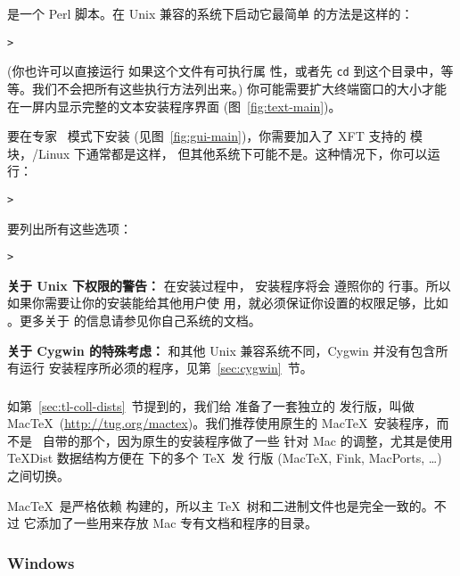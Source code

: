 \documentclass{article}
\begin{document}
 是一个 Perl 脚本。在 Unix 兼容的系统下启动它最简单
的方法是这样的：

\begin{alltt}
> 
\end{alltt}
(你也许可以直接运行  如果这个文件有可执行属
性，或者先 \texttt{cd} 到这个目录中，等等。我们不会把所有这些执行方法列出来。)
你可能需要扩大终端窗口的大小才能在一屏内显示完整的文本安装程序界面
(图~\ref{fig:text-main})。

要在专家 \GUI\ 模式下安装 (见图~\ref{fig:gui-main})，你需要加入了
XFT 支持的 模块，\GNU/Linux 下通常都是这样，
但其他系统下可能不是。这种情况下，你可以运行：
\begin{alltt}
> 
\end{alltt}

要列出所有这些选项：
\begin{alltt}
> 
\end{alltt}

\textbf{关于 Unix 下权限的警告：} 在安装过程中，\TL{} 安装程序将会
遵照你的  行事。所以如果你需要让你的安装能给其他用户使
用，就必须保证你设置的权限足够，比如 。更多关于
 的信息请参见你自己系统的文档。

\textbf{关于 Cygwin 的特殊考虑：} 和其他 Unix 兼容系统不同，Cygwin
并没有包含所有运行 \TL{} 安装程序所必须的程序，见第~\ref{sec:cygwin}~节。

\subsubsection{\MacOSX}
\label{sec:macosx}

如第~\ref{sec:tl-coll-dists}~节提到的，我们给 \MacOSX 准备了一套独立的
发行版，叫做 Mac\TeX\ (\url{http://tug.org/mactex})。我们推荐使用原生的
Mac\TeX\ 安装程序，而不是 \TL\ 自带的那个，因为原生的安装程序做了一些
针对 Mac 的调整，尤其是使用 \TeX{}Dist 数据结构方便在 \MacOSX 下的多个 \TeX\ 发
行版 (Mac\TeX, Fink, MacPorts, \ldots) 之间切换。

Mac\TeX\ 是严格依赖 \TL 构建的，所以主 \TeX\ 树和二进制文件也是完全一致的。不过
它添加了一些用来存放 Mac 专有文档和程序的目录。

\subsubsection{Windows}\label{sec:wininst}
\end{document}

